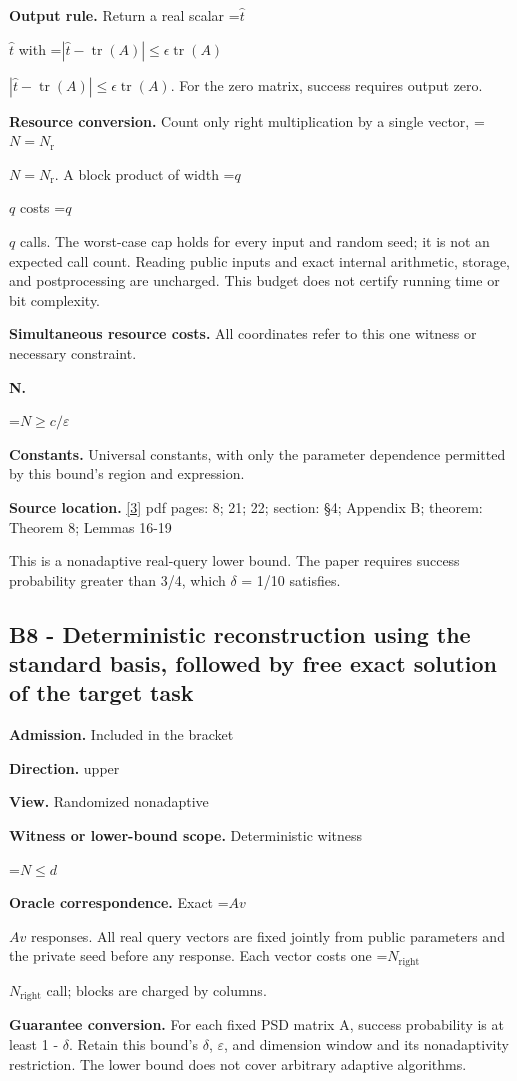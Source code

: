 \documentclass[10pt,a4paper]{article}
\newcommand{\AtlasMath}[1]{\par\begingroup\centering\setbox0=\hbox{$\displaystyle #1$}\ifdim\wd0>1.4\linewidth\typeout{ATLAS WIDE FORMULA: \the\wd0}\fi\ifdim\wd0>\linewidth\resizebox{\linewidth}{!}{\box0}\else\box0\fi\par\endgroup}
\newcommand{\AtlasInlineMath}[1]{\begingroup\setbox0=\hbox{$#1$}\ifdim\wd0>.4\linewidth\endgroup\AtlasMath{#1}\else\endgroup$#1$\fi}
\begin{document}
\textbf{Output rule.} Return a real scalar \AtlasInlineMath{\widehat t} with \AtlasInlineMath{|\widehat t-\operatorname{tr}(A)|\le\epsilon\operatorname{tr}(A)}. For the zero matrix, success requires output zero.

\textbf{Resource conversion.} Count only right multiplication by a single vector, \AtlasInlineMath{N=N_{\mathrm r}}. A block product of width \AtlasInlineMath{q} costs \AtlasInlineMath{q} calls. The worst-case cap holds for every input and random seed; it is not an expected call count. Reading public inputs and exact internal arithmetic, storage, and postprocessing are uncharged. This budget does not certify running time or bit complexity.

\textbf{Simultaneous resource costs.} All coordinates refer to this one witness or necessary constraint.

\textbf{N.}

\AtlasMath{N\ge c/\varepsilon}
\textbf{Constants.} Universal constants, with only the parameter dependence permitted by this bound’s region and expression.

\textbf{Source location.} \href{https://arxiv.org/pdf/2010.09649v5}{[3]} pdf pages: 8; 21; 22; section: §4; Appendix B; theorem: Theorem 8; Lemmas 16-19

This is a nonadaptive real-query lower bound. The paper requires success probability greater than 3/4, which $\delta$ = 1/10 satisfies.

\subsection{B8 - Deterministic reconstruction using the standard basis, followed by free exact solution of the target task}
\textbf{Admission.} Included in the bracket

\textbf{Direction.} upper

\textbf{View.} Randomized nonadaptive

\textbf{Witness or lower-bound scope.} Deterministic witness

\AtlasMath{N\le d}
\textbf{Oracle correspondence.} Exact \AtlasInlineMath{Av} responses. All real query vectors are fixed jointly from public parameters and the private seed before any response. Each vector costs one \AtlasInlineMath{N_{\mathrm{right}}} call; blocks are charged by columns.

\textbf{Guarantee conversion.} For each fixed PSD matrix A, success probability is at least 1 - $\delta$. Retain this bound’s $\delta$, $\varepsilon$, and dimension window and its nonadaptivity restriction. The lower bound does not cover arbitrary adaptive algorithms.
\end{document}
